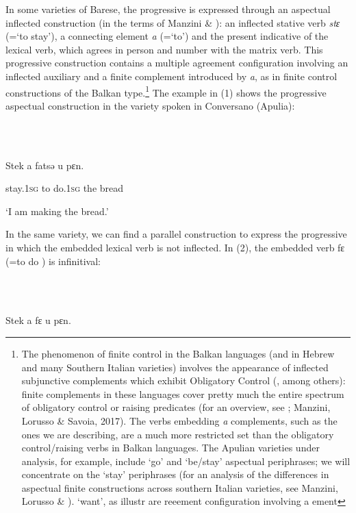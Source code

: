 \documentclass[output=paper]{langsci/langscibook}
\begin{document}
In some varieties of Barese, the progressive is expressed through an aspectual inflected construction (in the terms of Manzini \& \citealt{Savoia2005}): an inflected stative verb \textit{stɛ} (=‘to stay’), a connecting element \textit{a} (=‘to’) and the present indicative of the lexical verb, which agrees in person and number with the matrix verb. This progressive construction contains a multiple agreement configuration involving an inflected auxiliary and a finite complement introduced by \textit{a}, as in finite control constructions of the Balkan type.\footnote{The phenomenon of finite control in the Balkan languages (and in Hebrew and many Southern Italian varieties) involves the appearance of inflected subjunctive complements which exhibit Obligatory Control (\citealt{Landau2004}, among others): finite complements in these languages cover pretty much the entire spectrum of obligatory control or raising predicates (for an overview, see \citealt{Ledgeway2015}; Manzini, Lorusso \& Savoia, 2017). The verbs embedding \textit{a} complements, such as the ones we are describing, are a much more restricted set than the obligatory control/raising verbs in Balkan languages. The Apulian varieties under analysis, for example, include ‘go’ and ‘be/stay’ aspectual periphrases; we will concentrate on the ‘stay’ periphrases (for an analysis of the differences in aspectual finite constructions across southern Italian varieties, see Manzini, Lorusso \& \citealt{Savoia2017}). ‘want’, as illustr are reeement configuration involving a ement}  The example in (1) shows the progressive aspectual construction in the variety spoken in Conversano (Apulia): 

\ea%
    \label{ex:key:1}
    \gll\\
        \\
    \glt
    \z

          Stek    a   fatsə    u    pɛn.     

stay.\textsc{1sg}   to  do.\textsc{1sg} the    bread

‘I am making the bread.’

In the same variety, we can find a parallel construction to express the progressive in which the embedded lexical verb is not inflected. In (2), the embedded verb fɛ (=to do ) is infinitival: 

\ea%
    \label{ex:key:2}
    \gll\\
        \\
    \glt
    \z

          Stek     a  fɛ     u    pɛn.      
\end{document}
